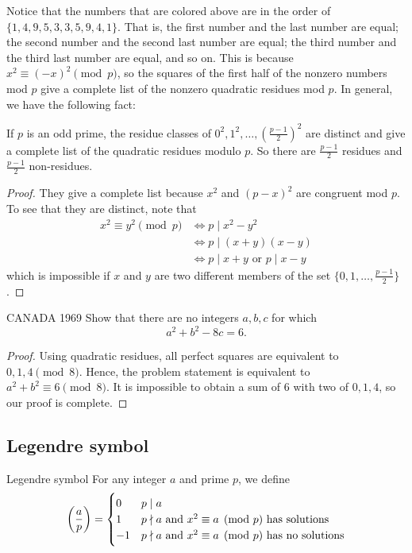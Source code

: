 Notice that the numbers that are colored above are in the order of $\{1,4,9,5,3,3,5,9,4,1\}$. That is, the first number and the last number are equal; the second number and the second last number are equal; the third number and the third last number are equal, and so on. This is because $x^2 \equiv (-x)^2 \pmod p$, so the squares of the first half of the nonzero numbers mod $p$ give a complete list of the nonzero quadratic residues mod $p$. In general, we have the following fact:
\begin{proposition}
If $p$ is an odd prime, the residue classes of $0^2,1^2,\dots,(\frac{p-1}{2})^2$ are distinct and give a complete list of the quadratic residues modulo $p$. So there are $\frac{p-1}{2}$ residues and $\frac{p-1}{2}$ non-residues.
\end{proposition}
\begin{proof}
They give a complete list because $x^2$ and $(p-x)^2$ are congruent mod $p$. To see that they are distinct, note that 
\begin{align*}
x^2 \equiv y^2 \pmod p
&\iff p \mid x^2-y^2 \\
&\iff p \mid (x+y)(x-y) \\
&\iff p \mid x+y \text{ or } p \mid x-y
\end{align*}
which is impossible if $x$ and $y$ are two different members of the set $\{0,1,\dots,\frac{p-1}{2}\}$.
\end{proof}

\begin{exmp}{CANADA 1969}{}
Show that there are no integers $a,b,c$ for which 
\[ a^2+b^2-8c=6. \]
\end{exmp}

\begin{proof}
Using quadratic residues, all perfect squares are equivalent to $0,1,4\pmod8$. Hence, the problem statement is equivalent to $a^2+b^2\equiv 6\pmod8$. It is impossible to obtain a sum of $6$ with two of $0,1,4$, so our proof is complete.
\end{proof}
\pagebreak

\subsection{Legendre symbol}
\begin{defn}{Legendre symbol}{}
For any integer $a$ and prime $p$, we define
\begin{equation}
\left(\frac{a}{p}\right) = 
\begin{cases}
    0 & p \mid a \\
	1 & p \nmid a \text{ and } x^2 \equiv a \pmod p \text{ has solutions}\\
	-1 & p \nmid a \text{ and } x^2 \equiv a \pmod p \text{ has no solutions}
\end{cases}
\end{equation}
\end{defn}

